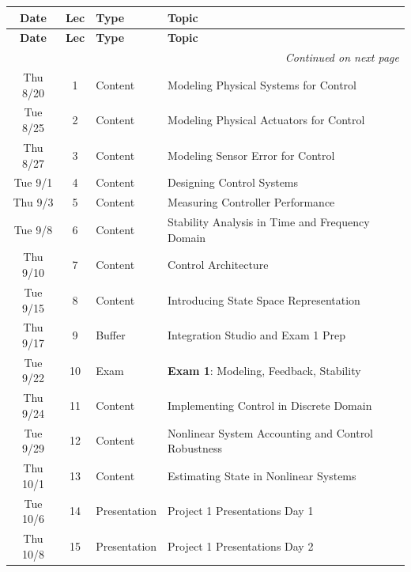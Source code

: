 \documentclass[11pt,letterpaper]{article}
\begin{document}
\vspace{1em}

\begin{longtable}{c c l p{10cm}}
\toprule
\textbf{Date} & \textbf{Lec} & \textbf{Type} & \textbf{Topic} \\
\midrule
\endfirsthead

\toprule
\textbf{Date} & \textbf{Lec} & \textbf{Type} & \textbf{Topic} \\
\midrule
\endhead

\midrule
\multicolumn{4}{r}{\textit{Continued on next page}} \\
\endfoot

\bottomrule
\endlastfoot

Thu 8/20 & 1 & Content & Modeling Physical Systems for Control \\

Tue 8/25 & 2 & Content & Modeling Physical Actuators for Control \\
Thu 8/27 & 3 & Content & Modeling Sensor Error for Control \\

Tue 9/1 & 4 & Content & Designing Control Systems \\
Thu 9/3 & 5 & Content & Measuring Controller Performance \\

Tue 9/8 & 6 & Content & Stability Analysis in Time and Frequency Domain \\
Thu 9/10 & 7 & Content & Control Architecture \\

Tue 9/15 & 8 & Content & Introducing State Space Representation \\
\rowcolor{bufferrow}
Thu 9/17 & 9 & Buffer & Integration Studio and Exam 1 Prep \\

\rowcolor{examrow}
Tue 9/22 & 10 & Exam & \textbf{Exam 1}: Modeling, Feedback, Stability \\
Thu 9/24 & 11 & Content & Implementing Control in Discrete Domain \\

Tue 9/29 & 12 & Content & Nonlinear System Accounting and Control Robustness \\
Thu 10/1 & 13 & Content & Estimating State in Nonlinear Systems \\

\rowcolor{presentrow}
Tue 10/6 & 14 & Presentation & Project 1 Presentations Day 1 \\
\rowcolor{presentrow}
Thu 10/8 & 15 & Presentation & Project 1 Presentations Day 2 \\


\end{longtable}
\end{document}
